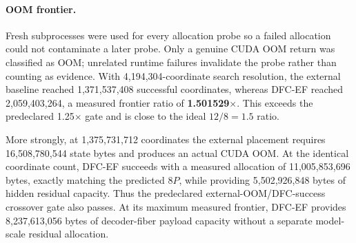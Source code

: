 \begin{table}[t]
\centering
\caption{Measured P100 allocation substitution.  ``Saved'' is external-EF
minus DFC-EF.  Steady savings equal the predicted $4P$ bytes at every tested
scale.  Timing is retained as a negative result for the unfused reference
implementation.}
\label{tab:dfc-ef-gpu-allocation}
\end{table}

\paragraph{OOM frontier.}
Fresh subprocesses were used for every allocation probe so a failed allocation
could not contaminate a later probe.  Only a genuine CUDA OOM return was
classified as OOM; unrelated runtime failures invalidate the probe rather than
counting as evidence.  With 4,194,304-coordinate search resolution, the
external baseline reached 1,371,537,408 successful coordinates, whereas DFC-EF
reached 2,059,403,264, a measured frontier ratio of
\textbf{1.501529$\times$}.  This exceeds the predeclared 1.25$\times$ gate and
is close to the ideal $12/8=1.5$ ratio.

More strongly, at 1,375,731,712 coordinates the external placement requires
16,508,780,544 state bytes and produces an actual CUDA OOM.  At the identical
coordinate count, DFC-EF succeeds with a measured allocation of
11,005,853,696 bytes, exactly matching the predicted $8P$, while providing
5,502,926,848 bytes of hidden residual capacity.  Thus the predeclared
external-OOM/DFC-success crossover gate also passes.  At its maximum measured
frontier, DFC-EF provides 8,237,613,056 bytes of decoder-fiber payload capacity
without a separate model-scale residual allocation.

